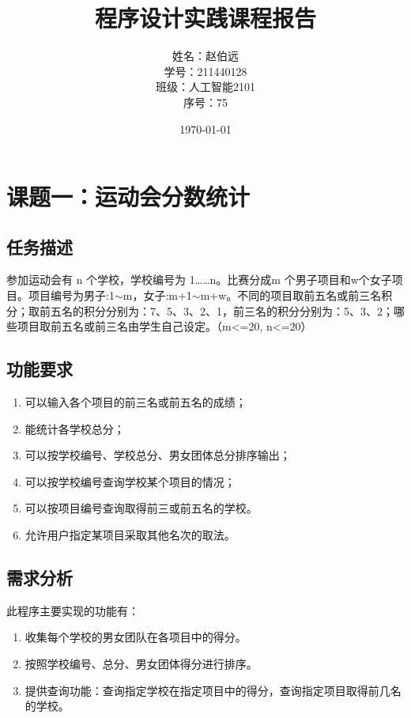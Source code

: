 \documentclass[UTF8,titlepage]{ctexart}
\numberwithin{figure}{section}
\begin{document}
\title{{\Huge{\textbf{程序设计实践课程报告}}}}
\author{姓名：赵伯远 \\ 学号：211440128 \\班级：人工智能2101 \\ 序号：75}
\date{\today}
\maketitle
\tableofcontents
\clearpage

\section{课题一：运动会分数统计}

\subsection{任务描述}

参加运动会有 n 个学校，学校编号为 1……n。比赛分成m 个男子项目和w个女子项目。项目编号为男子:1$\sim$m，女子:m+1$\sim$m+w。不同的项目取前五名或前三名积分；取前五名的积分分别为：7、5、3、2、1，前三名的积分分别为：5、3、2；哪些项目取前五名或前三名由学生自己设定。（m<=20, n<=20）
 
\subsection{功能要求}

\begin{enumerate}
    \item 可以输入各个项目的前三名或前五名的成绩；
    \item 能统计各学校总分；
    \item 可以按学校编号、学校总分、男女团体总分排序输出；
    \item 可以按学校编号查询学校某个项目的情况；
    \item 可以按项目编号查询取得前三或前五名的学校。
    \item 允许用户指定某项目采取其他名次的取法。
    \end{enumerate}

\subsection{需求分析}
此程序主要实现的功能有：
\begin{enumerate}
    \item 收集每个学校的男女团队在各项目中的得分。
    \item 按照学校编号、总分、男女团体得分进行排序。
    \item 提供查询功能：查询指定学校在指定项目中的得分，查询指定项目取得前几名的学校。
\end{enumerate}
\end{document}
